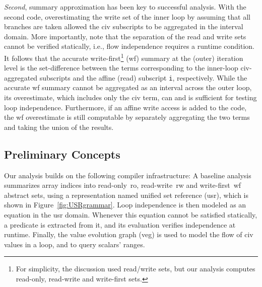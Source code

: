 \documentclass{sig-alternate}
\begin{document}
{\em Second}, summary approximation has been key to successful
analysis. With the second code, overestimating the write set 
of the inner loop by assuming that all branches are taken 
allowed the {\sc civ} subscripts to be aggregated in the 
interval domain. 
More importantly, note that the separation of the 
read and write sets cannot be verified statically, i.e.,
flow independence requires a runtime condition. 
It follows that the accurate write-first\footnote{
For simplicity, the discussion used read/write sets, 
but our analysis computes read-only, read-write and write-first sets.
}
({\sc wf}) summary at the (outer) iteration level is the 
set-difference between the terms corresponding to the inner-loop 
{\sc civ}-aggregated subscripts and the affine (read) subscript {\tt i},
respectively.  While the accurate {\sc wf} summary cannot be aggregated 
as an interval across the outer loop, its overestimate,
which includes only the {\sc civ} term, can and is sufficient
for testing loop independence. Furthermore, if an affine
write access is added to the code, the {\sc wf} overestimate
is still computable by separately aggregating the two
terms and taking the union of the results.


\subsection{Preliminary Concepts}
\label{subsec:Background}

Our analysis builds on the following compiler infrastructure:
A baseline analysis summarizes array indices into read-only~{\sc ro}, 
read-write~{\sc rw} and write-first~{\sc wf} abstract sets, using a 
representation named unified set reference ({\sc usr}), which is shown 
in Figure~\ref{fig:USRgrammar}.
%
Loop independence is then modeled as an equation in the 
{\sc usr} domain. 
%
Whenever this equation cannot be satisfied statically, a predicate 
is extracted from it, and its evaluation verifies independence 
at runtime. 
%
Finally, the value evolution graph ({\sc veg}) is used to model the 
flow of {\sc civ} values in a loop, and to query scalars' ranges.

\end{document}
